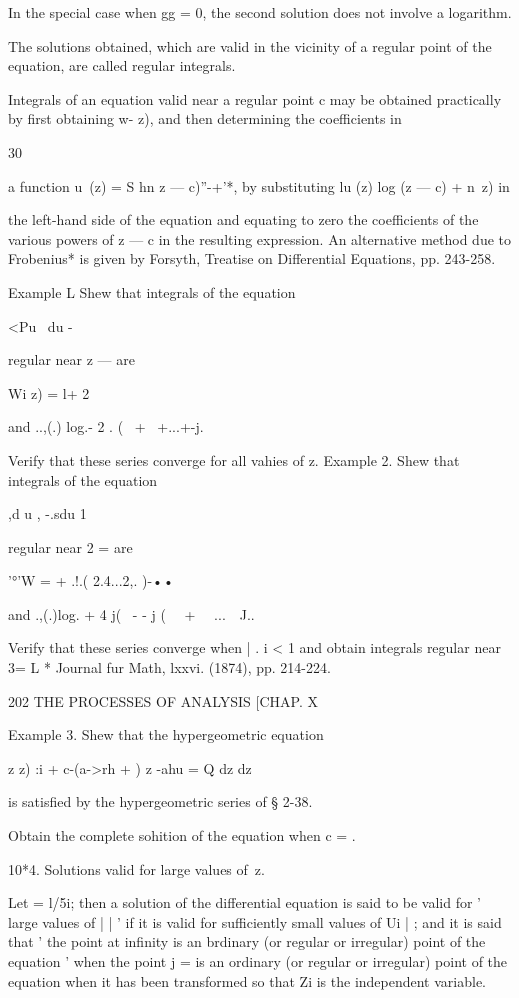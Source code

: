 In the special case when gg = 0, the second solution does not involve 
a logarithm. 

The solutions obtained, which are valid in the vicinity of a regular point 
of the equation, are called regular integrals. 

Integrals of an equation valid near a regular point c may be obtained 
practically by first obtaining w-   z), and then determining the coefficients in 

30 

a function u\ (z) = S hn z — c)''-+'*, by substituting lu  (z) log (z — c) + n\  z) in 

the left-hand side of the equation and equating to zero the coefficients of the 
various powers of z — c in the resulting expression. An alternative method 
due to Frobenius* is given by Forsyth, Treatise on Differential Equations, 
pp. 243-258. 

Example L Shew that integrals of the equation 

<Pu \ du   - 

regular near z — are 

Wi z) = l+ 2 



and ..,(.) log.-  2  .   ( \  + \ +...+-j. 

Verify that these series converge for all vahies of z. 
Example 2. Shew that integrals of the equation 

 ,d u ,  -.sdu 1   

regular near 2 = are 

'°'W =   + .!.( 2.4...2,. )-•• 

and .,(.)log. + 4 j( \  - - j ( \ \   + \ \ ...\ \ J.. 

Verify that these series converge when | . i < 1 and obtain integrals regular near 3= L 
* Journal fur Math, lxxvi. (1874), pp. 214-224. 



202 THE PROCESSES OF ANALYSIS [CHAP. X 

Example 3. Shew that the hypergeometric equation 

z  z)  :i +  c-(a->rh +  ) z   -ahu = Q 
dz  dz 

is satisfied by the hypergeometric series of § 2-38. 

Obtain the complete sohition of the equation when c = .  

10*4. Solutions valid for large values of\ z.  

Let   = l/5i; then a solution of the differential equation is said to be 
valid for ' large values of |   | ' if it is valid for sufficiently small values of Ui | ; 
and it is said that ' the point at infinity is an brdinary (or regular or irregular) 
point of the equation ' when the point  j = is an ordinary (or regular or 
irregular) point of the equation when it has been transformed so that Zi is 
the independent variable. 

